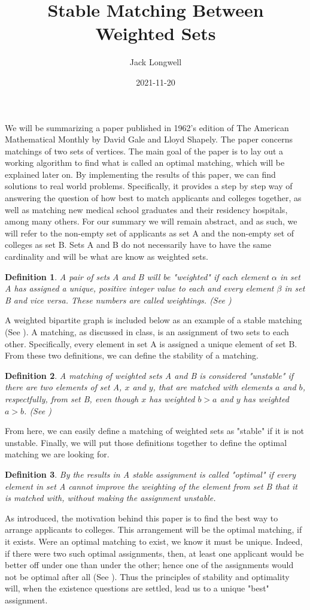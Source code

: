 \documentclass[letterpaper,11pt,twocolumn]{article}
\title{Stable Matching Between Weighted Sets}
\author{Jack Longwell}
\date{2021-11-20}
\newtheorem{definition}{Definition}
\begin{document}
\maketitle %
We will be summarizing a paper published in 1962's edition of The American Mathematical Monthly by David Gale and Lloyd Shapely. The paper concerns matchings of two sets of vertices. The main goal of the paper is to lay out a working algorithm to find what is called an optimal matching, which will be explained later on. By implementing the results of this paper, we can find solutions to real world problems. Specifically, it provides a step by step way of answering the question of how best to match applicants and colleges together, as well as matching new medical school graduates and their residency hospitals, among many others. For our summary we will remain abstract, and as such, we will refer to the non-empty set of applicants as set A and the non-empty set of colleges as set B. Sets A and B do not necessarily have to have the same cardinality and will be what are know as weighted sets.
\begin{definition}
	A pair of sets A and B  will be "weighted" if each element $\alpha$ in set A has assigned a unique, positive integer value to each and every element $\beta$ in set B and vice versa. These numbers are called weightings. (See \cite{Alpin})
\end{definition}
A weighted bipartite graph is included below as an example of a stable matching (See \cite{image}).
	A matching, as discussed in class, is an assignment of two sets to each other. Specifically, every element in set A is assigned a unique element of set B. From these two definitions, we can define the stability of a matching.
	
\begin{definition}
	A matching of weighted sets A and B is considered "unstable" if there are two elements of set A, $x$ and $y$, that are matched with elements $a$ and $b$, respectfully, from set B, even though $x$ has weighted $b > a$ and $y$ has weighted $a > b$. (See \cite{latexcompanion})
\end{definition}		
From here, we can easily define a matching of weighted sets as "stable" if it is not unstable. Finally, we will put those definitions together to define the optimal matching we are looking for.
\begin{definition}
	By the results in \cite{latexcompanion} A stable assignment is called "optimal" if every element in set A cannot improve the weighting of the element from set B that it is matched with, without making the assignment unstable.
\end{definition}
As introduced, the motivation behind this paper is to find the best way to arrange applicants to colleges. This arrangement will be the optimal matching, if it exists. Were an optimal matching to exist, we know it must be unique. Indeed, if there were two such optimal assignments, then, at least one applicant would be better off under one than under the other; hence one of the assignments would not be optimal after all (See \cite{latexcompanion}). Thus the principles of stability and optimality will, when the existence questions are settled, lead us to a unique "best" assignment.
\end{document}
